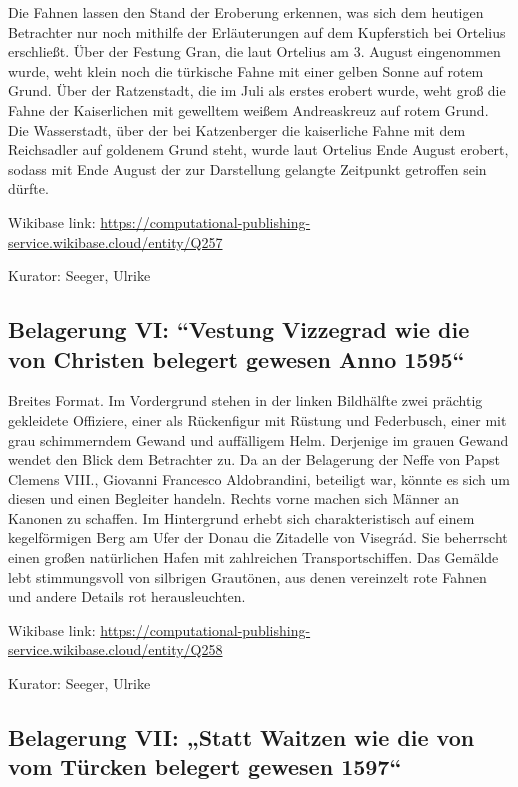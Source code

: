 \documentclass[
  11pt,
  a4paper,
  openany]{book}
\begin{document}
Die Fahnen lassen den Stand der Eroberung erkennen, was sich dem
heutigen Betrachter nur noch mithilfe der Erläuterungen auf dem
Kupferstich bei Ortelius erschließt. Über der Festung Gran, die laut
Ortelius am 3. August eingenommen wurde, weht klein noch die türkische
Fahne mit einer gelben Sonne auf rotem Grund. Über der Ratzenstadt, die
im Juli als erstes erobert wurde, weht groß die Fahne der Kaiserlichen
mit gewelltem weißem Andreaskreuz auf rotem Grund. Die Wasserstadt, über
der bei Katzenberger die kaiserliche Fahne mit dem Reichsadler auf
goldenem Grund steht, wurde laut Ortelius Ende August erobert, sodass
mit Ende August der zur Darstellung gelangte Zeitpunkt getroffen sein
dürfte.

Wikibase link:
\url{https://computational-publishing-service.wikibase.cloud/entity/Q257}

Kurator: Seeger, Ulrike

\subsection{Belagerung VI: ``Vestung Vizzegrad wie die von Christen
belegert gewesen Anno
1595``}\label{belagerung-vi-vestung-vizzegrad-wie-die-von-christen-belegert-gewesen-anno-1595}

Breites Format. Im Vordergrund stehen in der linken Bildhälfte zwei
prächtig gekleidete Offiziere, einer als Rückenfigur mit Rüstung und
Federbusch, einer mit grau schimmerndem Gewand und auffälligem Helm.
Derjenige im grauen Gewand wendet den Blick dem Betrachter zu. Da an der
Belagerung der Neffe von Papst Clemens VIII., Giovanni Francesco
Aldobrandini, beteiligt war, könnte es sich um diesen und einen
Begleiter handeln. Rechts vorne machen sich Männer an Kanonen zu
schaffen. Im Hintergrund erhebt sich charakteristisch auf einem
kegelförmigen Berg am Ufer der Donau die Zitadelle von Visegrád. Sie
beherrscht einen großen natürlichen Hafen mit zahlreichen
Transportschiffen. Das Gemälde lebt stimmungsvoll von silbrigen
Grautönen, aus denen vereinzelt rote Fahnen und andere Details rot
herausleuchten.

Wikibase link:
\url{https://computational-publishing-service.wikibase.cloud/entity/Q258}

Kurator: Seeger, Ulrike

\subsection{Belagerung VII: „Statt Waitzen wie die von vom Türcken
belegert gewesen
1597``}\label{belagerung-vii-statt-waitzen-wie-die-von-vom-tuxfcrcken-belegert-gewesen-1597}
\end{document}
